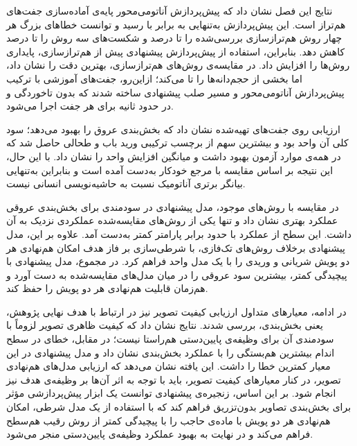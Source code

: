 نتایج این فصل نشان داد که پیش‌پردازش آناتومی‌محور پایه‌ی آماده‌سازی جفت‌های هم‌تراز است. این پیش‌پردازش به‌تنهایی به  برابر با  رسید و توانست خطاهای بزرگ هر چهار روش هم‌ترازسازی بررسی‌شده را  تا  درصد و شکست‌های سه روش را  تا  درصد کاهش دهد. بنابراین، استفاده از پیش‌پردازش پیشنهادی پیش از هم‌ترازسازی، پایداری روش‌ها را افزایش داد. در مقایسه‌ی روش‌های هم‌ترازسازی،  بهترین دقت را نشان داد، اما بخشی از حجم‌دانه‌ها را تا می‌کند؛ ازاین‌رو، جفت‌های آموزشی با ترکیب پیش‌پردازش آناتومی‌محور و مسیر صلب پیشنهادی ساخته شدند که بدون تاخوردگی و در حدود  ثانیه برای هر جفت اجرا می‌شود.

ارزیابی روی جفت‌های تهیه‌شده نشان داد که  بخش‌بندی عروق را بهبود می‌دهد؛ سود کلی آن  واحد  بود و بیشترین سهم از برچسب ترکیبی ورید باب و طحالی حاصل شد که در همه‌ی موارد آزمون بهبود داشت و میانگین افزایش  واحد را نشان داد. با این حال، این نتیجه بر اساس مقایسه با مرجع خودکار به‌دست آمده است و بنابراین به‌تنهایی بیانگر برتری آناتومیک نسبت به حاشیه‌نویسی انسانی نیست.

در مقایسه با روش‌های موجود، مدل پیشنهادی در سودمندی برای بخش‌بندی عروقی عملکرد بهتری نشان داد و تنها یکی از روش‌های مقایسه‌شده عملکردی نزدیک به آن داشت. این سطح از عملکرد با حدود  برابر پارامتر کمتر به‌دست آمد. علاوه بر این، مدل پیشنهادی برخلاف روش‌های تک‌فازی، با شرطی‌سازی بر فاز هدف امکان هم‌نهادی هر دو پویش شریانی و وریدی را با یک مدل واحد فراهم کرد. در مجموع، مدل پیشنهادی با پیچیدگی کمتر، بیشترین سود عروقی را در میان مدل‌های مقایسه‌شده به دست آورد و هم‌زمان قابلیت هم‌نهادی هر دو پویش را حفظ کند.

در ادامه، معیارهای متداول ارزیابی کیفیت تصویر نیز در ارتباط با هدف نهایی پژوهش، یعنی بخش‌بندی، بررسی شدند. نتایج نشان داد که کیفیت ظاهری تصویر لزوماً با سودمندی آن برای وظیفه‌ی پایین‌دستی هم‌راستا نیست؛ در مقابل، خطای  در سطح اندام بیشترین هم‌بستگی را با عملکرد بخش‌بندی نشان داد و مدل پیشنهادی در این معیار کمترین خطا را داشت. این یافته نشان می‌دهد که ارزیابی مدل‌های هم‌نهادی تصویر، در کنار معیارهای کیفیت تصویر، باید با توجه به اثر آن‌ها بر وظیفه‌ی هدف نیز انجام شود. بر این اساس، زنجیره‌ی پیشنهادی توانست یک ابزار پیش‌پردازشی مؤثر برای بخش‌بندی تصاویر بدون‌تزریق فراهم کند که با استفاده از یک مدل شرطی، امکان هم‌نهادی هر دو پویش با ماده‌ی حاجب را با پیچیدگی کمتر از روش رقیب هم‌سطح فراهم می‌کند و در نهایت به بهبود عملکرد وظیفه‌ی پایین‌دستی منجر می‌شود.
